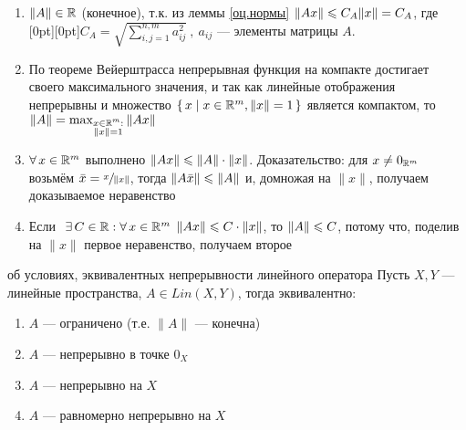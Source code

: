 \begin{zam}[https://youtu.be/OazzLm0DJN4?si=PGiZPb67g0zgXEMt&t=547] %
	\begin{enumerate}\makeatletter\renewcommand{\p@enumi}{зам.~\thezam.}\makeatother 
		\item\label{зам к опр. норм.1}
		$\|A\| \in \mathbb R$ (конечное), т.к. из леммы \ref{оц.нормы} $\|Ax\| \leqslant C_A\|x\| = C_A$, где \raisebox{0pt}[0pt][0pt]{$C_A = \sqrt{\sum\limits_{i, j = 1}^{n, m}a_{ij}^2}\ ,\ a_{ij}$} --- элементы матрицы $A$.\medskip
		
		\item По теореме Вейерштрасса непрерывная функция на компакте достигает своего максимального значения, и так как линейные отображения непрерывны и множество $\{\, x \mid x \in \mathbb R^m, \|x\| = 1 \,\}$ является компактом, то $\|A\| = \max_{\substack{x \in \mathbb R^m: \\ \|x\| = 1}} \|Ax\|$  
		
		\item\label{зам к опр. норм.2} $\forall \, x \in \mathbb R^m$ выполнено $\|Ax\| \leqslant \|A\| \cdot \|x\|$. Доказательство: для $x \ne 0_{\mathbb R^m}$ возьмём $\bar x = \sfrac{x}{\|x\|}$, тогда $\|A\bar x\| \leqslant \|A\|$  и, домножая на $\|x\|$, получаем доказываемое неравенство \vspace{-8pt}
		
		\item Если$\E C \in \rr : \A x \in \rmm$ $\|Ax\| \leqslant C \cdot \|x\|$, то $\|A\| \leqslant C$, потому что, поделив на $\|x\|$ первое неравенство, получаем второе 
		\end{enumerate}
\end{zam} %
\vspace{-1.5ex}
\begin{lem}[https://youtu.be/OazzLm0DJN4?si=Qwpn9tVeLwf_T6DS&t=1617]{об условиях, эквивалентных непрерывности линейного оператора}
	Пусть $X, Y$ --- линейные пространства, $A \in Lin(X, Y)$, тогда эквивалентно:
	\begin{multicols}{2}\begin{enumerate}[itemindent=20pt]
		\item $A$ --- ограничено (т.е. $\|A\|$ --- конечна)
		
		\item $A$ --- непрерывно в точке $0_X$
		
		\item $A$ --- непрерывно на $X$
		
		\item $A$ --- равномерно непрерывно на $X$
	\end{enumerate}\end{multicols}
\end{lem}

